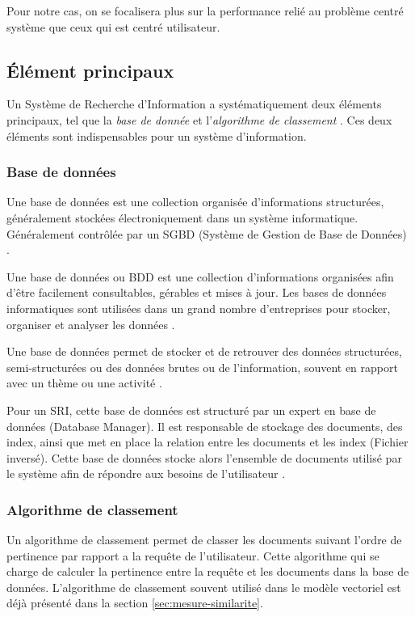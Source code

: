 Pour notre cas, on se focalisera plus sur la performance relié au problème centré système que ceux qui est centré utilisateur.

\subsection{Élément principaux}
Un Système de Recherche d'Information a systématiquement deux éléments principaux, tel que la \textit{base de donnée} et l'\textit{algorithme de classement} \citep{approche-semantique}. Ces deux éléments sont indispensables pour un système d'information.

\subsubsection{Base de données}
\begin{definition}
	Une base de données est une collection organisée d’informations structurées, généralement stockées
	électroniquement dans un système informatique. Généralement contrôlée par un SGBD (Système de Gestion de Base de Données) \citep{oracle-database}.
\end{definition}

\begin{definition}
	Une base de données ou BDD est une collection d’informations organisées afin d’être facilement consultables, gérables et mises à jour. Les bases de données informatiques sont utilisées dans un grand nombre d’entreprises pour stocker, organiser et analyser les données \citep{lebigdata}.
\end{definition}

\begin{definition}
	Une base de données permet de stocker et de retrouver des données structurées, semi-structurées ou des données brutes ou de l'information, souvent en rapport avec un thème ou une activité	\citep{wiki-database}.
\end{definition}

Pour un SRI, cette base de données est structuré par un expert en base de données (Database Manager). Il est responsable de stockage des documents, des index, ainsi que met en place la relation entre les documents et les index (Fichier inversé). Cette base de données stocke alors l'ensemble de documents utilisé par le système afin de répondre aux besoins de l'utilisateur \citep{vsm-for-arabic-language}.

\subsubsection{Algorithme de classement}
Un algorithme de classement permet de classer les documents suivant l'ordre de pertinence par rapport a la requête de l'utilisateur. Cette algorithme qui se charge de calculer la pertinence entre la requête et les documents dans la base de données. L'algorithme de classement souvent utilisé dans le modèle vectoriel est déjà présenté dans la section \ref{sec:mesure-similarite}.

